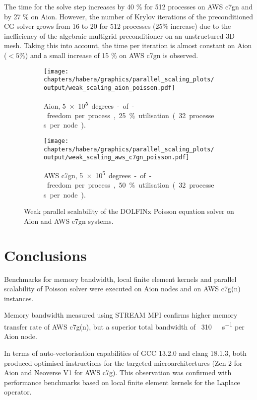 The time for the solve step increases by 40 \% for 512 processes on AWS c7gn and
by 27 \% on Aion. However, the number of Krylov iterations of the preconditioned
CG solver grows from 16 to 20 for 512 processes (25\% increase) due to the
inefficiency of the algebraic multigrid preconditioner on an unstructured 3D
mesh. Taking this into account, the time per iteration is almost constant on
Aion ($< 5\%$) and a small increase of 15 \% on AWS c7gn is observed.

\begin{figure}
    \begin{subfigure}{.7\textwidth}
	\begin{center}
        \texttt{[image: chapters/habera/graphics/parallel\_scaling\_plots/output/weak\_scaling\_aion\_poisson.pdf]}
        \caption{Aion, \SI{5e+5} degrees-of-freedom per process, 25 \% utilisation (32 processes per node).}
        \label{fig:weak-scaling-aion}
	\end{center}
    \end{subfigure}

    \begin{subfigure}{.7\textwidth}
	\begin{center}
        \texttt{[image: chapters/habera/graphics/parallel\_scaling\_plots/output/weak\_scaling\_aws\_c7gn\_poisson.pdf]}
        \caption{AWS c7gn, \SI{5e+5} degrees-of-freedom per process, 50 \% utilisation (32 processes per node).}
        \label{fig:weak-scaling-aws}
	\end{center}
    \end{subfigure}
    \caption{Weak parallel scalability of the DOLFINx Poisson equation solver on Aion and AWS c7gn systems.}
    \label{fig:weak-scaling}
\end{figure}

\section*{Conclusions}

Benchmarks for memory bandwidth, local finite element kernels and parallel
scalability of Poisson solver were executed on Aion nodes and on AWS c7g(n)
instances.

Memory bandwidth measured using STREAM MPI confirms higher memory transfer rate
of AWS c7g(n), but a superior total bandwidth of
~\SI{310}{\giga\byte\per\second} per Aion node.

In terms of auto-vectorisation capabilities of GCC 13.2.0 and clang 18.1.3, both
produced optimised instructions for the targeted microarchitectures (Zen 2 for
Aion and Neoverse V1 for AWS c7g). This observation was confirmed with
performance benchmarks based on local finite element kernels for the Laplace
operator.

